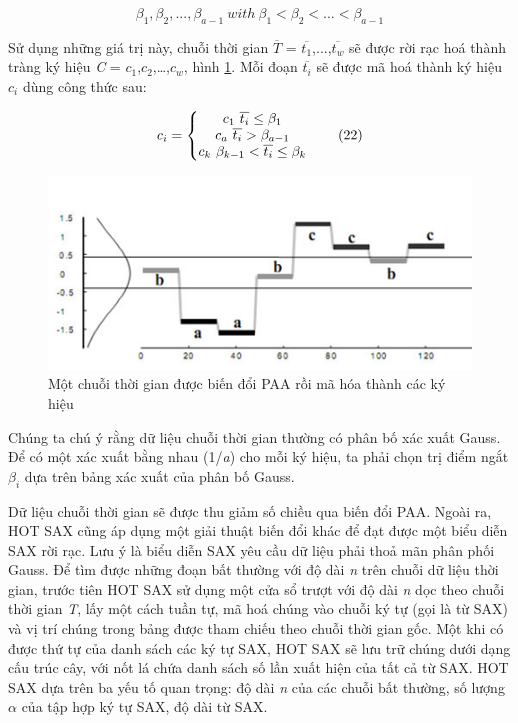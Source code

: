 \begin{equation}
\label{eq:21}
\beta_1,\beta_2,...,\beta_{a-1} \:  with \: \beta_1 < \beta_2 <...< \beta_{a-1}
\tag{21}
\end{equation}

Sử dụng những giá trị này, chuỗi thời gian $\overline{T}$ = $\overline{t_1}$,...,$\overline{t_w}$ sẽ được rời rạc hoá thành tràng ký hiệu \textit{C} = $c_{1}$,$c_{2}$,…,$c_{w}$, hình \ref{fig:3-7}. Mỗi đoạn $\overline{t_i}$ sẽ được mã hoá thành ký hiệu $c_{i}$ dùng công thức sau:

\begin{equation}
\label{eq:22}
c_i=\left\{\begin{matrix}
c_1 $ $ \overline{t_i} \leq \beta_1
\\ c_a $ $ \overline{t_i} >  \beta_{a-1}
\\ c_k $ $ \beta_{k-1} < \overline{t_i} \leq \beta_k
\end{matrix}\right.
\tag{22}
\end{equation}

\begin{figure}[H]
    \centering
    \includegraphics[scale=0.75]{./content/images/3-7.png}
    \caption{Một chuỗi thời gian được biến đổi PAA rồi mã hóa thành các ký hiệu \cite{st12}}
    \label{fig:3-7}
\end{figure}

Chúng ta chú ý rằng dữ liệu chuỗi thời gian thường có phân bố xác xuất Gauss. Để có một xác xuất bằng nhau (1/\textit{a}) cho mỗi ký hiệu, ta phải chọn trị điểm ngắt $\beta_{i}$ dựa trên bảng xác xuất của phân bố Gauss.

Dữ liệu chuỗi thời gian sẽ được thu giảm số chiều qua biến đổi PAA. Ngoài ra, HOT SAX cũng áp dụng một giải thuật biến đổi khác để đạt được một biểu diễn SAX rời rạc. Lưu ý là biểu diễn SAX yêu cầu dữ liệu phải thoả mãn phân phối Gauss. Để tìm được những đoạn bất thường với độ dài \textit{n} trên chuỗi dữ liệu thời gian, trước tiên HOT SAX sử dụng một cửa sổ trượt với độ dài \textit{n} dọc theo chuỗi thời gian \textit{T}, lấy một cách tuần tự, mã hoá chúng vào chuỗi ký tự (gọi là từ SAX) và vị trí chúng trong bảng được tham chiếu theo chuỗi thời gian gốc. Một khi có được thứ tự của danh sách các ký tự SAX, HOT SAX sẽ lưu trữ chúng dưới dạng cấu trúc cây, với nốt lá chứa danh sách số lần xuất hiện của tất cả từ SAX. HOT SAX dựa trên ba yếu tố quan trọng: độ dài \textit{n} của các chuỗi bất thường, số lượng \textit{$\alpha$} của tập hợp ký tự SAX, độ dài từ SAX.


